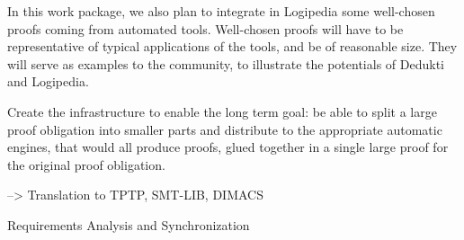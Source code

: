 \begin{workpackage}[id=atpetc,wphases=0-48,
  short=ATPs etc.,%
  title={ATP, SAT, SMT, Model checkers},
  lead=ULi,
  ULiRM=10]
\begin{wpdescription}
In this work package, we also plan to integrate in Logipedia some
well-chosen proofs coming from automated tools.  Well-chosen proofs
will have to be representative of typical applications of the tools,
and be of reasonable size.  They will serve as examples to the
community, to illustrate the potentials of Dedukti and Logipedia.


Create the infrastructure to enable the long term goal: be able to split a large proof
obligation into smaller parts and distribute to the appropriate automatic engines, that
would all produce proofs, glued together in a single large proof for the original proof
obligation.
\end{wpdescription}

\begin{tasklist}
  \begin{task}[id=tools,title=Automatic Tools Exporting Proofs]
  \end{task}

  \begin{task}[id=challenges,title=Logipedia as a Source of Challenges for Automatic Reasoners]
    --> Translation to TPTP, SMT-LIB, DIMACS
  \end{task}
  \begin{task}[id=commang,title=A language for Communication between Automatic Reasoners]
  \end{task}
\end{tasklist}

\begin{wpdelivs}
  \begin{wpdeliv}[due=3,miles=startup,id=requirements,dissem=PU,nature=DEM,lead=ISa]
      {Requirements Analysis and Synchronization}
\end{wpdeliv}
\end{wpdelivs}
\end{workpackage}

